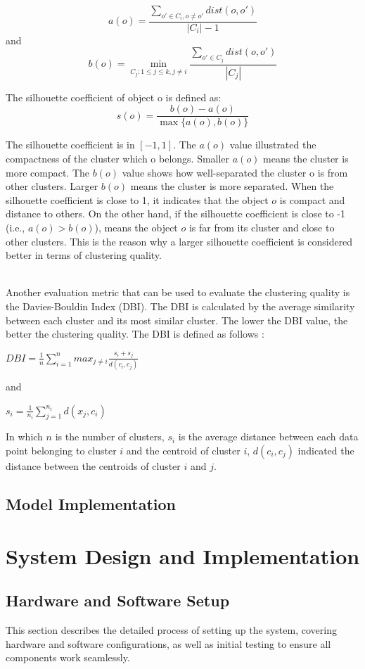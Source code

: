 \documentclass{article}
\makeatletter
\newcommand\subsubsubsection{\@startsection{paragraph}{4}{\z@}{-2.5ex\@plus -1ex \@minus -.25ex}{1.25ex \@plus .25ex}{\normalfont\normalsize\bfseries}}
\makeatother
\begin{document}
$$a(o) = \frac{\sum_{o' \in C_i , o \neq o'} dist(o,o')}{|C_i| - 1}$$
and
$$b(o) = \min_{C_j: 1 \leq j \leq k, j \neq i} \frac{\sum_{o' \in C_j} dist(o,o')}{|C_j|}$$

The silhouette coefficient of object o is defined as:
$$s(o) = \frac{b(o) - a(o)}{\max\{a(o),b(o)\}}$$

\noindent The silhouette coefficient is in $[-1,1]$. The $a(o)$ value illustrated
the compactness of the cluster which o belongs. Smaller $a(o)$ means the
cluster is more compact. The $b(o)$ value shows how well-separated the 
cluster o is from other clusters. Larger $b(o)$ means the cluster is
more separated. When the silhouette coefficient is close to 1, it indicates
that the object $o$ is compact and distance to others. On the other hand, 
if the silhouette coefficient is close to -1 (i.e., $a(o) > b(o)$), means
the object $o$ is far from its cluster and close to other clusters. This is
the reason why a larger silhouette coefficient is considered better in terms of
clustering quality. 


\subsubsubsection{Davies-Bouldin Index}
\\
\noindent Another evaluation metric that can be used to evaluate
the clustering quality is the Davies-Bouldin Index (DBI). The DBI
is calculated by the average similarity between each cluster and its
most similar cluster. The lower the DBI value, the better the clustering
quality. The DBI is defined as follows \citep{HOSEN2023688}:

$ DBI = \frac{1}{n} \sum_{i=1}^{n} max_{j \neq i} \frac{s_i + s_j}{d(c_i,c_j)}$

and 

$s_i = \frac{1}{n_i} \sum_{j=1}^{n_i} d(x_j,c_i)$

\noindent In which $n$ is the number of clusters, $s_i$ is the average distance between
each data point belonging to cluster $i$ and the centroid of cluster $i$, 
$d(c_i,c_j)$ indicated the distance between the centroids of cluster $i$ and
$j$.

\subsection{Model Implementation}

\section{System Design and Implementation}  

\subsection{Hardware and Software Setup}  
This section describes the detailed process of setting up the system, covering hardware and software configurations, as well as initial testing to ensure all components work seamlessly.
\end{document}
